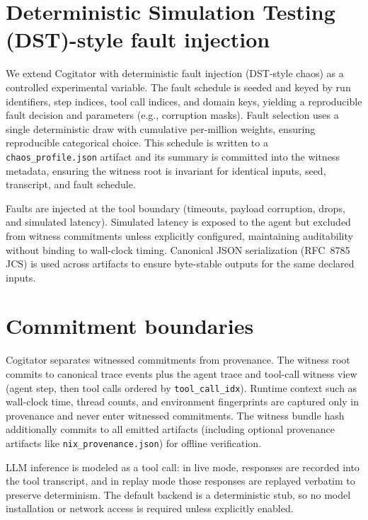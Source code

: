 \section{Deterministic Simulation Testing (DST)-style fault injection}
\label{sec:dst}

We extend Cogitator with deterministic fault injection (DST-style chaos) as a controlled
experimental variable. The fault schedule is seeded and keyed by run identifiers,
step indices, tool call indices, and domain keys, yielding a reproducible fault decision
and parameters (e.g., corruption masks). Fault selection uses a single deterministic
draw with cumulative per-million weights, ensuring reproducible categorical choice. This
schedule is written to a
\texttt{chaos\_profile.json} artifact and its summary is committed into the witness
metadata, ensuring the witness root is invariant for identical inputs, seed, transcript,
and fault schedule.

Faults are injected at the tool boundary (timeouts, payload corruption, drops, and
simulated latency). Simulated latency is exposed to the agent but excluded from witness
commitments unless explicitly configured, maintaining auditability without binding to
wall-clock timing. Canonical JSON serialization (RFC~8785 JCS) is used across artifacts
to ensure byte-stable outputs for the same declared inputs.

\section{Commitment boundaries}
\label{sec:commitments}

Cogitator separates witnessed commitments from provenance. The witness root commits to
canonical trace events plus the agent trace and tool-call witness view (agent step, then
tool calls ordered by \texttt{tool\_call\_idx}). Runtime context such as wall-clock time,
thread counts, and environment fingerprints are captured only in provenance and never
enter witnessed commitments. The witness bundle hash additionally commits to all emitted
artifacts (including optional provenance artifacts like \texttt{nix\_provenance.json})
for offline verification.

LLM inference is modeled as a tool call: in live mode, responses are recorded into the
tool transcript, and in replay mode those responses are replayed verbatim to preserve
determinism. The default backend is a deterministic stub, so no model installation or
network access is required unless explicitly enabled.


